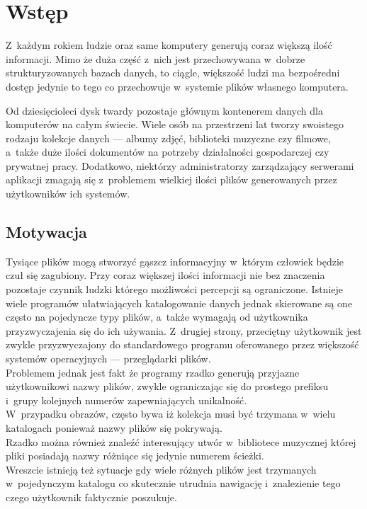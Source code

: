 \chapter{Wstęp}
\label{wstep}

\par
 Z~każdym rokiem ludzie oraz same komputery generują coraz większą ilość informacji.
Mimo że duża część z~nich jest przechowywana w~dobrze strukturyzowanych bazach danych, to ciągle, większość ludzi ma bezpośredni dostęp jedynie to tego co przechowuje w~systemie plików własnego komputera.
\par
Od dziesięcioleci dysk twardy pozostaje głównym kontenerem danych dla komputerów na całym świecie.
Wiele osób na przestrzeni lat tworzy swoistego rodzaju kolekcje danych --- albumy zdjęć, biblioteki muzyczne czy filmowe, a~także duże ilości dokumentów na potrzeby działalności gospodarczej czy prywatnej pracy. Dodatkowo, niektórzy administratorzy zarządzający serwerami aplikacji zmagają się z~problemem wielkiej ilości plików generowanych przez użytkowników ich systemów.

\section{Motywacja}
\label{motywacja}
\par
Tysiące plików mogą stworzyć gąszcz informacyjny w~którym człowiek będzie czuł się zagubiony. Przy coraz większej ilości informacji nie bez znaczenia pozostaje czynnik ludzki którego możliwości percepcji są ograniczone.
Istnieje wiele programów ułatwiających katalogowanie danych jednak skierowane są one często na pojedyncze typy plików, a~także wymagają od użytkownika przyzwyczajenia się do ich używania. Z~drugiej strony, przeciętny użytkownik jest zwykle przyzwyczajony do standardowego programu oferowanego przez większość systemów operacyjnych --- przeglądarki plików.\\

Problemem jednak jest fakt że programy rzadko generują przyjazne użytkownikowi nazwy plików, zwykle ograniczając się do prostego prefiksu i~grupy kolejnych numerów zapewniających unikalność.\\
 W~przypadku obrazów, często bywa iż kolekcja musi być trzymana w~wielu katalogach ponieważ nazwy plików się pokrywają.\\
Rzadko można również znaleźć interesujący utwór w~bibliotece muzycznej której pliki posiadają nazwy różniące się jedynie numerem ścieżki.\\
Wreszcie istnieją też sytuacje gdy wiele różnych plików jest trzymanych w~pojedynczym katalogu co skutecznie utrudnia nawigację i~znalezienie tego czego użytkownik faktycznie poszukuje.

